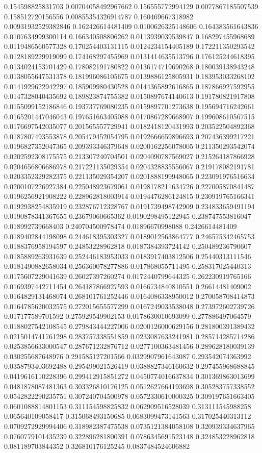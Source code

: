 \begin{table}
\begin{tabu}
\begin{sparkline}{10}
0.154598825831703 0.00704058492967662 0.156555772994129 0.0077867185507539 0.158512720156556 0.00855354326914787 0.160469667318982 0.00931932529382846 0.162426614481409 0.0100626325148606 0.164383561643836 0.0107634999300114 0.166340508806262 0.0113939039539847 0.168297455968689 0.0119486560577328 0.170254403131115 0.0124234154405189 0.172211350293542 0.0128189229919099 0.174168297455969 0.0131414635513796 0.176125244618395 0.0134024153701429 0.178082191780822 0.0136174719690268 0.180039138943248 0.0138055647531378 0.181996086105675 0.0139886125805931 0.183953033268102 0.0141929622942297 0.185909980430528 0.0144365892616865 0.187866927592955 0.0147328040435692 0.189823874755382 0.0150897674140613 0.191780821917808 0.0155099152186846 0.193737769080235 0.0159897701273638 0.195694716242661 0.0165201447046043 0.197651663405088 0.0170867289668907 0.199608610567515 0.0176697542035077 0.201565557729941 0.0182418120431993 0.203522504892368 0.0187807493553878 0.205479452054795 0.0192666659896693 0.207436399217221 0.0196827352047365 0.209393346379648 0.0200162256078005 0.211350293542074 0.0202592308175575 0.213307240704501 0.0204090787569027 0.215264187866928 0.0204656806686978 0.217221135029354 0.0204328835556067 0.219178082191781 0.0203352329282375 0.221135029354207 0.0201888199948065 0.223091976516634 0.0200107226927384 0.225048923679061 0.0198178211634726 0.227005870841487 0.0196256921908222 0.228962818003914 0.0194476286124815 0.230919765166341 0.0192938254835919 0.232876712328767 0.0191739498742909 0.234833659491194 0.0190878341367655 0.23679060665362 0.0190298495122945 0.238747553816047 0.018992739668403 0.240704500978474 0.01896670998088 0.2426614481409 0.0189402844198098 0.244618395303327 0.0189012563864777 0.246575342465753 0.0188376958194597 0.24853228962818 0.0187384393724142 0.250489236790607 0.0185889263931639 0.252446183953033 0.0183917403812506 0.25440313111546 0.0181490882658034 0.256360078277886 0.017868055711495 0.258317025440313 0.0175607229041639 0.26027397260274 0.0172440799644325 0.262230919765166 0.0169397442711454 0.264187866927593 0.0166734840810551 0.26614481409002 0.0164829131468074 0.268101761252446 0.0164086338950012 0.270058708414873 0.0164785620032575 0.272015655577299 0.0167249033538048 0.273972602739726 0.017177589701592 0.275929549902153 0.0178630010693099 0.277886497064579 0.0188027542108545 0.279843444227006 0.0200126000629156 0.281800391389432 0.0215014741761298 0.283757338551859 0.0233087633241981 0.285714285714286 0.0253856633000547 0.287671232876712 0.0277100363481456 0.289628180039139 0.030255687648976 0.291585127201566 0.0329907961643087 0.293542074363992 0.0358793403692488 0.295499021526419 0.0388827346160632 0.297455968688845 0.0419616110228396 0.299412915851272 0.0450774016637834 0.301369863013699 0.0481878087481363 0.303326810176125 0.0512627664193698 0.305283757338552 0.0542822290235751 0.307240704500978 0.0572330610000325 0.309197651663405 0.0601088814801153 0.311154598825832 0.062909516528039 0.313111545988258 0.065640109058417 0.315068493150685 0.0683099473141563 0.317025440313112 0.0709272929994406 0.318982387475538 0.0735121384058108 0.320939334637965 0.0760779101435239 0.322896281800391 0.0786345691523148 0.324853228962818 0.081189703844352 0.326810176125245 0.0837484524606882 
\end{sparkline}
\end{tabu}
\end{table}
